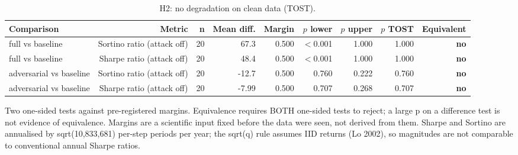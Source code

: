 \begin{table}[htbp]
  \centering
  \caption{H2: no degradation on clean data (TOST).}
  \label{tab:equivalence}
  \begin{tabular}{lrrrrrrrr}
    \toprule
    Comparison & Metric & n & Mean diff. & Margin & $p$ lower & $p$ upper & $p$ TOST & Equivalent \\
    \midrule
    full vs baseline & Sortino ratio (attack off) & 20 & 67.3 & 0.500 & $<$0.001 & 1.000 & 1.000 & \textbf{no} \\
    full vs baseline & Sharpe ratio (attack off) & 20 & 48.4 & 0.500 & $<$0.001 & 1.000 & 1.000 & \textbf{no} \\
    adversarial vs baseline & Sortino ratio (attack off) & 20 & -12.7 & 0.500 & 0.760 & 0.222 & 0.760 & \textbf{no} \\
    adversarial vs baseline & Sharpe ratio (attack off) & 20 & -7.99 & 0.500 & 0.707 & 0.268 & 0.707 & \textbf{no} \\
    \bottomrule
  \end{tabular}
  \begin{minipage}{\linewidth}\vspace{4pt}\footnotesize Two one-sided tests against pre-registered margins. Equivalence requires BOTH one-sided tests to reject; a large p on a difference test is not evidence of equivalence. Margins are a scientific input fixed before the data were seen, not derived from them. Sharpe and Sortino are annualised by sqrt(10,833,681) per-step periods per year; the sqrt(q) rule assumes IID returns (Lo 2002), so magnitudes are not comparable to conventional annual Sharpe ratios.\end{minipage}
\end{table}
